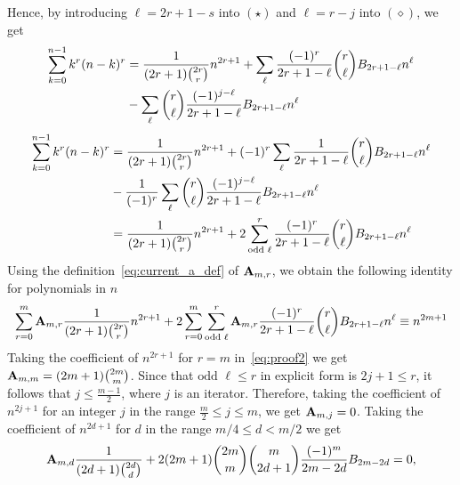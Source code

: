 Hence, by introducing $\ell=2r+1-s$ into $(\star)$ and $\ell=r-j$ into $(\diamond)$, we get
\begin{equation*}
    \begin{split}
        \sum_{k=0}^{n-1} k^r (n-k)^r
        &=\frac{1}{(2r+1) \binom{2r}{r}} n^{2r+1}
        +\sum_{\ell} \frac{(-1)^r}{2r+1-\ell} \binom{r}{\ell} {B}\sb{2r+1-\ell} n^{\ell} \\
        &-\sum_{\ell} \binom{r}{\ell} \frac{(-1)^{j-\ell}}{2r+1-\ell} {B}\sb{2r+1-\ell} n^{\ell}
    \end{split}
\end{equation*}
\begin{equation*}
    \begin{split}
        \sum_{k=0}^{n-1} k^r (n-k)^r
        &=\frac{1}{(2r+1) \binom{2r}{r}} n^{2r+1}
        +(-1)^{r} \sum_{\ell} \frac{1}{2r+1-\ell} \binom{r}{\ell} {B}\sb{2r+1-\ell} n^{\ell} \\
        &-\frac{1}{(-1)^{r}} \sum_{\ell} \binom{r}{\ell} \frac{(-1)^{j-\ell}}{2r+1-\ell} {B}\sb{2r+1-\ell} n^{\ell} \\
        &=\frac{1}{(2r+1) \binom{2r}{r}}n^{2r+1}
        +2 \sum_{\text{odd } \ell}^{r} \frac{(-1)^r}{2r+1-\ell} \binom{r}{\ell} {B}\sb{2r+1-\ell} n^{\ell}
    \end{split}
\end{equation*}
Using the definition~\eqref{eq:current_a_def} of ${\mathbf{A}} \sb{m,r}$, we obtain the following identity for polynomials in $n$
\begin{equation}
    \label{eq:proof2}
    \sum_{r=0}^{m} {\mathbf{A}} \sb{m,r} \frac{1}{(2r+1) \binom{2r}{r}} n^{2r+1}
    +2 \sum_{r=0}^{m}\sum_{\text{odd } \ell}^{r} {\mathbf{A}} \sb{m,r} \frac{(-1)^r}{2r+1-\ell}
    \binom{r}{\ell} {B}\sb{2r+1-\ell} n^{\ell}
    \equiv
    n^{2m+1}
\end{equation}
Taking the coefficient of $n^{2r+1}$ for $r=m$ in~\eqref{eq:proof2} we get ${\mathbf{A}} \sb{m,m} = (2m+1) \binom{2m}{m}$.
Since that $\text{odd } \ell \leq r$ in explicit form is $2j + 1 \leq r$, it follows that $j \leq \frac{m-1}{2}$,
where $j$ is an iterator.
Therefore, taking the coefficient of $n^{2j+1}$ for an integer $j$ in the range $\frac{m}{2} \leq j \leq m$,
we get ${\mathbf{A}} \sb{m,j} = 0$.
Taking the coefficient of $n^{2d+1}$ for $d$ in the range $m/4 \leq d < m/2$ we get
\begin{equation*}
    {\mathbf{A}} \sb{m,d} \frac{1}{(2d+1) \binom{2d}{d}}
    +2 (2m+1) \binom{2m}{m} \binom{m}{2d+1} \frac{(-1)^m}{2m-2d} {B}\sb{2m-2d} = 0,
\end{equation*}
